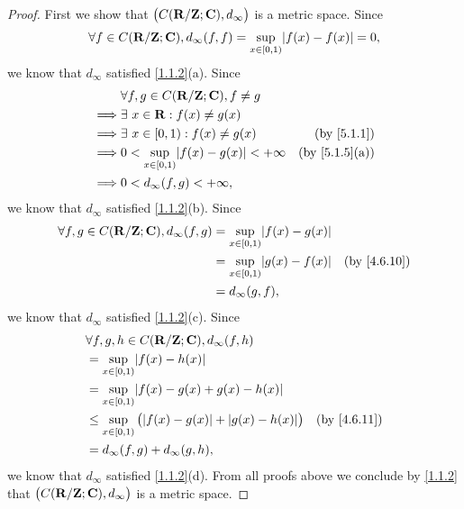 \begin{proof}
  First we show that \(\big(C(\mathbf{R} / \mathbf{Z} ; \mathbf{C}), d_\infty\big)\) is a metric space.
  Since
  \[
    \forall f \in C(\R / \Z ; \C), d_\infty(f, f) = \sup_{x \in [0, 1)} \abs{f(x) - f(x)} = 0,
  \]
  we know that \(d_\infty\) satisfied \cref{1.1.2}(a).
  Since
  \begin{align*}
             & \forall f, g \in C(\R / \Z ; \C), f \neq g                                        \\
    \implies & \exists\ x \in \R : f(x) \neq g(x)                                                \\
    \implies & \exists\ x \in [0, 1) : f(x) \neq g(x)              & \text{(by \cref{5.1.1})}    \\
    \implies & 0 < \sup_{x \in [0, 1)} \abs{f(x) - g(x)} < +\infty & \text{(by \cref{5.1.5}(a))} \\
    \implies & 0 < d_\infty(f, g) < +\infty,
  \end{align*}
  we know that \(d_\infty\) satisfied \cref{1.1.2}(b).
  Since
  \begin{align*}
    \forall f, g \in C(\R / \Z ; \C), d_\infty(f, g) & = \sup_{x \in [0, 1)} \abs{f(x) - g(x)}                             \\
                                                     & = \sup_{x \in [0, 1)} \abs{g(x) - f(x)} & \text{(by \cref{4.6.10})} \\
                                                     & = d_\infty(g, f),
  \end{align*}
  we know that \(d_\infty\) satisfied \cref{1.1.2}(c).
  Since
  \begin{align*}
     & \forall f, g, h \in C(\R / \Z ; \C), d_\infty(f, h)                                                  \\
     & = \sup_{x \in [0, 1)} \abs{f(x) - h(x)}                                                              \\
     & = \sup_{x \in [0, 1)} \abs{f(x) - g(x) + g(x) - h(x)}                                                \\
     & \leq \sup_{x \in [0, 1)} \big(\abs{f(x) - g(x)} + \abs{g(x) - h(x)}\big) & \text{(by \cref{4.6.11})} \\
     & = d_\infty(f, g) + d_\infty(g, h),
  \end{align*}
  we know that \(d_\infty\) satisfied \cref{1.1.2}(d).
  From all proofs above we conclude by \cref{1.1.2} that \(\big(C(\mathbf{R} / \mathbf{Z} ; \mathbf{C}), d_\infty\big)\) is a metric space.


\end{proof}
